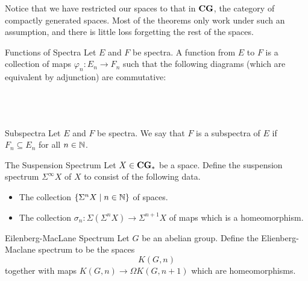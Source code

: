 \documentclass[a4paper]{article}
\begin{document}
Notice that we have restricted our spaces to that in $\bold{CG}$, the category of compactly generated spaces. Most of the theorems only work under such an assumption, and there is little loss forgetting the rest of the spaces. 

\begin{defn}{Functions of Spectra}{} Let $E$ and $F$ be spectra. A function from $E$ to $F$ is a collection of maps $\varphi_n:E_n\to F_n$ such that the following diagrams (which are equivalent by adjunction) are commutative: \\~\\
\\~\\
\end{defn}

\begin{defn}{Subspectra}{} Let $E$ and $F$ be spectra. We say that $F$ is a subspectra of $E$ if $F_n\subseteq E_n$ for all $n\in\mathbb{N}$. 
\end{defn}

\begin{defn}{The Suspension Spectrum}{} Let $X\in\bold{CG}_\ast$ be a space. Define the suspension spectrum $\Sigma^\infty X$ of $X$ to consist of the following data. 
\begin{itemize}
\item The collection $\{\Sigma^n X\;|\;n\in\mathbb{N}\}$ of spaces. 
\item The collection $\sigma_n:\Sigma(\Sigma^nX)\to\Sigma^{n+1}X$ of maps which is a homeomorphism. 
\end{itemize}
\end{defn}

\begin{defn}{Eilenberg-MacLane Spectrum}{} Let $G$ be an abelian group. Define the Elienberg-Maclane spectrum to be the spaces $$K(G,n)$$ together with maps $K(G,n)\to\Omega K(G,n+1)$ which are homeomorphisms. 
\end{defn}
\end{document}

